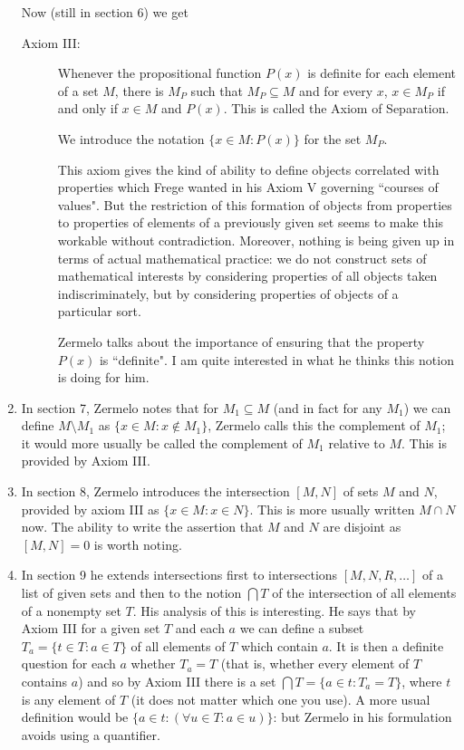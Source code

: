 \documentclass[12pt]{article}
\begin{document}
\begin{enumerate}
Now (still in section 6) we get

\begin{description}

\item[Axiom III:]  Whenever the propositional function $P(x)$ is definite for each element of a set $M$, there is $M_P$ such that $M_P \subseteq M$ and for every $x$,
$x \in M_P$ if and only if $x \in M$ and $P(x)$.  This is called the Axiom of Separation.

We introduce the notation $\{x \in M:P(x)\}$ for the set $M_P$.

This axiom gives the kind of ability to define objects correlated with properties which Frege wanted in his Axiom V governing ``courses of values".  But the restriction of
this formation of objects from properties to properties of elements of a previously given set seems to make this workable without contradiction.  Moreover, nothing is being given up
in terms of actual mathematical practice:  we do not construct sets of mathematical interests by considering properties of all objects taken indiscriminately, but by considering properties of objects of a particular sort.

Zermelo talks about the importance of ensuring that the property $P(x)$ is ``definite".  I am quite interested in what he thinks this notion is doing for him.

\end{description}

\item  In section 7, Zermelo notes that for $M_1 \subseteq M$ (and in fact for any $M_1$) we can define $M \setminus M_1$ as $\{x \in M: x \not\in M_1\}$,  Zermelo calls this the complement of $M_1$;  it would more usually be called the complement of $M_1$ relative to $M$.  This is provided by Axiom III.

\item In section 8, Zermelo introduces the intersection $[M,N]$ of sets $M$ and $N$, provided by axiom III as $\{x \in M:x \in N\}$.  This is more usually written $M \cap N$ now.  The ability to write the assertion that $M$ and $N$ are disjoint as $[M,N]=0$ is worth noting.

\item In section 9 he extends intersections first to intersections $[M,N,R, \ldots]$ of a list of given sets and then to the notion $\bigcap T$ of the intersection of all elements of
a nonempty set $T$.  His analysis of this is interesting.  He says that by Axiom III for a given set $T$ and each $a$ we can define a subset $T_a = \{t \in T:a \in T\}$ of all elements of $T$
which contain $a$.  It is then a definite question for each $a$ whether $T_a=T$ (that is, whether every element of $T$ contains $a$) and so by Axiom III there is a
set $\bigcap T = \{a \in t:T_a=T\}$, where $t$ is any element of $T$ (it does not matter which one you use).  A more usual definition would be $\{a \in t:(\forall u \in T:a \in u)\}$:  but Zermelo in his formulation avoids using a quantifier.


\end{enumerate}
\end{document}
